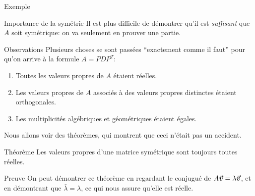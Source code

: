 \documentclass[a4paper]{article}
\begin{document}
\begin{parag}{Exemple}
\begin{subparag}{Importance de la symétrie}
        Il est plus difficile de démontrer qu'il est \textit{suffisant} que $A$ soit symétrique: on va seulement en prouver une partie.
    \end{subparag}

    \begin{subparag}{Observations}
        Plusieurs choses se sont passées ``exactement comme il faut'' pour qu'on arrive à la formule $A = PDP^T$:
        \begin{enumerate}
            \item Toutes les valeurs propres de $A$ étaient réelles.
            \item Les valeurs propres de $A$ associés à des valeurs propres distinctes étaient orthogonales.
            \item Les multiplicités algébriques et géométriques étaient égales.
        \end{enumerate}

        Nous allons voir des théorèmes, qui montrent que ceci n'était pas un accident.
    \end{subparag}
\end{parag}

\begin{parag}{Théorème}
    Les valeurs propres d'une matrice symétrique sont toujours toutes réelles.

    \begin{subparag}{Preuve}
        On peut démontrer ce théorème en regardant le conjugué de $A \bm{\protect\vec{v}} = \lambda \bm{\protect\vec{v}}$, et en démontrant que $\bar{\lambda} = \lambda$, ce qui nous assure qu'elle est réelle.
    \end{subparag}
\end{parag}
\end{document}
